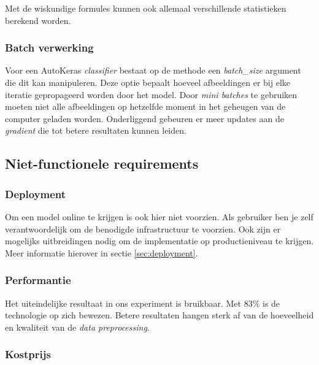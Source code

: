 Met de wiskundige formules kunnen ook allemaal verschillende statistieken berekend worden.

\subsubsection{Batch verwerking}
\label{sucsubsec:autokeras-fr-batch}

Voor een AutoKeras \textit{classifier} bestaat op de  methode een \textit{batch\_size} argument die dit kan manipuleren. Deze optie bepaalt hoeveel afbeeldingen er bij elke iteratie gepropageerd worden door het model. Door \textit{mini batches} te gebruiken moeten niet alle afbeeldingen op hetzelfde moment in het geheugen van de computer geladen worden. Onderliggend gebeuren er meer updates aan de \textit{gradient} die tot betere resultaten kunnen leiden.

\subsection{Niet-functionele requirements}
\label{subsec:autokeras-nfr} 

\subsubsection{Deployment}
\label{sucsubsec:autokeras-nfr-deployment}

Om een model online te krijgen is ook hier niet voorzien. Als gebruiker ben je zelf verantwoordelijk om de benodigde infrastructuur te voorzien. Ook zijn er mogelijks uitbreidingen nodig om de implementatie op productieniveau te krijgen. Meer informatie hierover in sectie \ref{sec:deployment}.

\subsubsection{Performantie}
\label{sucsubsec:autokeras-nfr-performantie}

Het uiteindelijke resultaat in ons experiment is bruikbaar. Met 83\% is de technologie op zich bewezen. Betere resultaten hangen sterk af van de hoeveelheid en kwaliteit van de \textit{data preprocessing}.

\subsubsection{Kostprijs}
\label{sucsubsec:autokeras-nfr-price}


